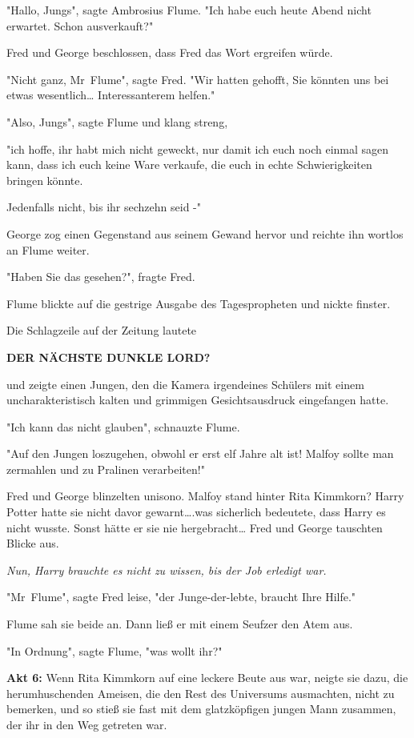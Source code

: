 {"Hallo, Jungs", sagte Ambrosius Flume. "Ich habe euch heute Abend nicht erwartet. Schon ausverkauft?"

Fred und George beschlossen, dass Fred das Wort ergreifen würde.

"Nicht ganz, Mr~Flume", sagte Fred. "Wir hatten gehofft, Sie könnten uns bei etwas wesentlich… Interessanterem helfen."

"Also, Jungs", sagte Flume und klang streng,

"ich hoffe, ihr habt mich nicht geweckt, nur damit ich euch noch einmal sagen kann, dass ich euch keine Ware verkaufe, die euch in echte Schwierigkeiten bringen könnte.

Jedenfalls nicht, bis ihr sechzehn seid -"

George zog einen Gegenstand aus seinem Gewand hervor und reichte ihn wortlos an Flume weiter.

"Haben Sie das gesehen?", fragte Fred.

Flume blickte auf die gestrige Ausgabe des Tagespropheten und nickte finster.

Die Schlagzeile auf der Zeitung lautete

\textbf{DER NÄCHSTE DUNKLE LORD?}

und zeigte einen Jungen, den die Kamera irgendeines Schülers mit einem uncharakteristisch kalten und grimmigen Gesichtsausdruck eingefangen hatte.

"Ich kann das nicht glauben", schnauzte Flume.

"Auf den Jungen loszugehen, obwohl er erst elf Jahre alt ist! Malfoy sollte man zermahlen und zu Pralinen verarbeiten!"

Fred und George blinzelten unisono. Malfoy stand hinter Rita Kimmkorn? Harry Potter hatte sie nicht davor gewarnt….was sicherlich bedeutete, dass Harry es nicht wusste. Sonst hätte er sie nie hergebracht… Fred und George tauschten Blicke aus.

\emph{Nun, Harry brauchte es nicht zu wissen, bis der Job erledigt war.}

"Mr~Flume", sagte Fred leise, "der Junge-der-lebte, braucht Ihre Hilfe."

Flume sah sie beide an. Dann ließ er mit einem Seufzer den Atem aus.

"In Ordnung", sagte Flume, "was wollt ihr?"

\textbf{Akt 6:} Wenn Rita Kimmkorn auf eine leckere Beute aus war, neigte sie dazu, die herumhuschenden Ameisen, die den Rest des Universums ausmachten, nicht zu bemerken, und so stieß sie fast mit dem glatzköpfigen jungen Mann zusammen, der ihr in den Weg getreten war.

}
